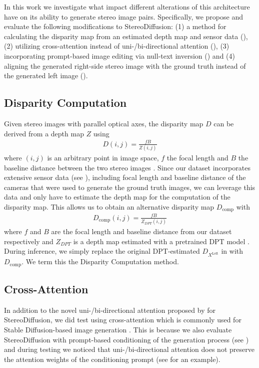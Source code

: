 In this work we investigate what impact different alterations of this architecture have on its ability to generate stereo image pairs. Specifically, we propose and evaluate the following modifications to StereoDiffusion: (1) a method for calculating the disparity map from an estimated depth map and sensor data (), (2) utilizing cross-attention \citep{rombach2022highresolutionimagesynthesislatent,vaswani-2017-transformer} instead of uni-/bi-directional attention \citep{Wang-2024-stereodiffusion} (), (3) incorporating prompt-based image editing via null-text inversion \citep{mokady2023null} () and (4) aligning the generated right-side stereo image with the ground truth instead of the generated left image ().

\subsection{Disparity Computation}\label{depth-to-disparity}
Given stereo images with parallel optical axes, the disparity map $D$ can be derived from a depth map $Z$ using
\begin{align}\label{eq:disparity}
    D(i,j)=\frac{fB}{Z(i,j)}
\end{align}
where $(i,j)$ is an arbitrary point in image space, $f$ the focal length and $B$ the baseline distance between the two stereo images \citep{Wang-2024-stereodiffusion}. Since our dataset incorporates extensive sensor data (see ), including focal length and baseline distance of the cameras that were used to generate the ground truth images, we can leverage this data and only have to estimate the depth map for the computation of the disparity map. This allows us to obtain an alternative disparity map $D_\text{comp}$ with
\begin{align}\label{eq:new-disparity}
    D_\text{comp}(i,j)=\frac{fB}{Z_{DPT}(i,j)}
\end{align}
where $f$ and $B$ are the focal length and baseline distance from our dataset respectively and $Z_{DPT}$ is a depth map estimated with a pretrained DPT model \citep{ranftl2021visiontransformersdenseprediction,ranftl2020midas}. During inference, we simply replace the original DPT-estimated $D_{X^\text{Left}}$ in  with $D_\text{comp}$. We term this the Disparity Computation method.  

\subsection{Cross-Attention}\label{cross-attn}
In addition to the novel uni-/bi-directional attention proposed by \cite{Wang-2024-stereodiffusion} for StereoDiffusion, we did test using cross-attention which is commonly used for Stable Diffusion-based image generation \citep{rombach2022highresolutionimagesynthesislatent,hertz2022prompt,mokady2023null}. This is because we also evaluate StereoDiffusion with prompt-based conditioning of the generation process (see ) and during testing we noticed that uni-/bi-directional attention does not preserve the attention weights of the conditioning prompt (see  for an example).

